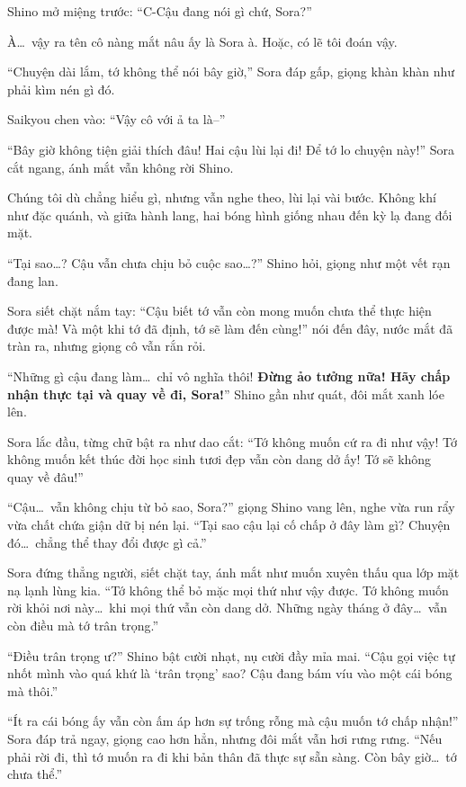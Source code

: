 \documentclass[../main.tex]{subfiles}
\begin{document}
Shino mở miệng trước: ``C-Cậu đang nói gì chứ, Sora?''

À\dots\ vậy ra tên cô nàng mắt nâu ấy là Sora à. Hoặc, có lẽ tôi đoán vậy.

``Chuyện dài lắm, tớ không thể nói bây giờ,'' Sora đáp gấp, giọng khàn khàn như phải kìm nén gì đó.

Saikyou chen vào: ``Vậy cô với ả ta là--''

``Bây giờ không tiện giải thích đâu! Hai cậu lùi lại đi! Để tớ lo chuyện này!'' Sora cắt ngang, ánh mắt vẫn không rời Shino.

Chúng tôi dù chẳng hiểu gì, nhưng vẫn nghe theo, lùi lại vài bước. Không khí như đặc quánh, và giữa hành lang, hai bóng hình giống nhau đến kỳ lạ đang đối mặt.

``Tại sao\dots? Cậu vẫn chưa chịu bỏ cuộc sao\dots?'' Shino hỏi, giọng như một vết rạn đang lan.

Sora siết chặt nắm tay: ``Cậu biết tớ vẫn còn mong muốn chưa thể thực hiện được mà! Và một khi tớ đã định, tớ sẽ làm đến cùng!'' nói đến đây, nước mắt đã tràn ra, nhưng giọng cô vẫn rắn rỏi.

``Những gì cậu đang làm\dots\ chỉ vô nghĩa thôi! \textbf{Đừng ảo tưởng nữa! Hãy chấp nhận thực tại và quay về đi, Sora!}'' Shino gần như quát, đôi mắt xanh lóe lên.

Sora lắc đầu, từng chữ bật ra như dao cắt: ``Tớ không muốn cứ ra đi như vậy! Tớ không muốn kết thúc đời học sinh tươi đẹp vẫn còn dang dở ấy! Tớ sẽ không quay về đâu!''

``Cậu\dots\ vẫn không chịu từ bỏ sao, Sora?'' giọng Shino vang lên, nghe vừa run rẩy vừa chất chứa giận dữ bị nén lại. ``Tại sao cậu lại cố chấp ở đây làm gì? Chuyện đó\dots\ chẳng thể thay đổi được gì cả.''

Sora đứng thẳng người, siết chặt tay, ánh mắt như muốn xuyên thấu qua lớp mặt nạ lạnh lùng kia. ``Tớ không thể bỏ mặc mọi thứ như vậy được. Tớ không muốn rời khỏi nơi này\dots\ khi mọi thứ vẫn còn dang dở. Những ngày tháng ở đây\dots\ vẫn còn điều mà tớ trân trọng.''

``Điều trân trọng ư?'' Shino bật cười nhạt, nụ cười đầy mỉa mai. ``Cậu gọi việc tự nhốt mình vào quá khứ là `trân trọng' sao? Cậu đang bám víu vào một cái bóng mà thôi.''

``Ít ra cái bóng ấy vẫn còn ấm áp hơn sự trống rỗng mà cậu muốn tớ chấp nhận!'' Sora đáp trả ngay, giọng cao hơn hẳn, nhưng đôi mắt vẫn hơi rưng rưng. ``Nếu phải rời đi, thì tớ muốn ra đi khi bản thân đã thực sự sẵn sàng. Còn bây giờ\dots\ tớ chưa thể.''
\end{document}
